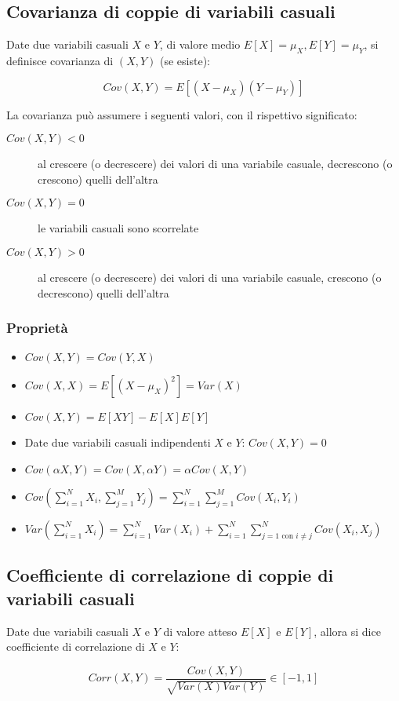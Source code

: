 \documentclass{subfiles}
\begin{document}
\subsection{Covarianza di coppie di variabili casuali}

Date due variabili casuali $X$ e $Y$, di valore medio $E[X]=\mu_X, E[Y]=\mu_Y$, si definisce covarianza di $(X,Y)$ (se esiste):

$$
Cov(X,Y) = E[(X-\mu_X)(Y-\mu_Y)]
$$

\noindent
La covarianza può assumere i seguenti valori, con il rispettivo significato:

\begin{description}
    \item[$Cov(X,Y) < 0$] al crescere (o decrescere) dei valori di una variabile casuale, decrescono (o crescono) quelli dell'altra
    \item[$Cov(X,Y) = 0$] le variabili casuali sono scorrelate
    \item[$Cov(X,Y) > 0$] al crescere (o decrescere) dei valori di una variabile casuale, crescono (o decrescono) quelli dell'altra
\end{description}

\subsubsection{Proprietà}

\begin{itemize}
    \item $Cov(X,Y) = Cov(Y,X)$
    \item $Cov(X,X) = E[(X-\mu_X)^2] = Var(X)$
    \item $Cov(X,Y) = E[XY] - E[X]E[Y]$
    \item Date due variabili casuali indipendenti $X$ e $Y$: $Cov(X,Y) = 0$
    \item $Cov(\alpha X,Y) = Cov(X, \alpha Y) = \alpha Cov(X,Y)$
    \item $Cov(\sum^N_{i=1}X_i, \sum^M_{j=1}Y_j) = \sum^N_{i=1}\sum^M_{j=1} Cov(X_i,Y_i)$
    \item $Var(\sum^N_{i=1}X_i) = \sum^N_{i=1} Var(X_i) + \sum^N_{i=1}\sum^N_{j=1 \text{ con } i \neq j} Cov(X_i, X_j)$
\end{itemize}

\subsection{Coefficiente di correlazione di coppie di variabili casuali}

Date due variabili casuali $X$ e $Y$ di valore atteso $E[X]$ e $E[Y]$, allora si dice coefficiente di correlazione di $X$ e $Y$:

$$
Corr(X,Y) = \frac{Cov(X,Y)}{\sqrt{Var(X)Var(Y)}} \in [-1, 1]
$$
\end{document}
